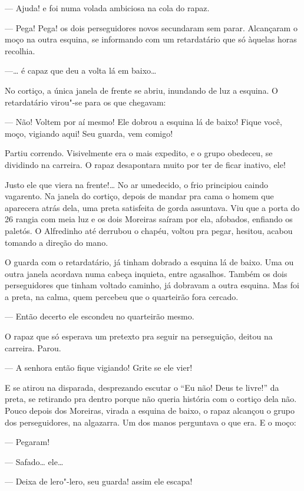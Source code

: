 --- Ajuda! e foi numa volada ambiciosa na cola do rapaz.

--- Pega! Pega! os dois perseguidores novos secundaram sem parar.
Alcançaram o moço na outra esquina, se informando com um retardatário
que só àquelas horas recolhia.

---\ldots{} é capaz que deu a volta lá em baixo\ldots{}

No cortiço, a única janela de frente se abriu, inundando de luz a
esquina. O retardatário virou"-se para os que chegavam:

--- Não! Voltem por aí mesmo! Ele dobrou a esquina lá de baixo! Fique
você, moço, vigiando aqui! Seu guarda, vem comigo!

Partiu correndo. Visivelmente era o mais expedito, e o grupo obedeceu,
se dividindo na carreira. O rapaz desapontara muito por ter de ficar
inativo, ele!

Justo ele que viera na frente!\ldots{} No ar umedecido, o frio principiou
caindo vagarento. Na janela do cortiço, depois de mandar pra cama o
homem que aparecera atrás dela, uma preta satisfeita de gorda assuntava.
Viu que a porta do 26 rangia com meia luz e os dois Moreiras saíram por
ela, afobados, enfiando os paletós. O Alfredinho até derrubou o chapéu,
voltou pra pegar, hesitou, acabou tomando a direção do mano.

O guarda com o retardatário, já tinham dobrado a esquina lá de baixo.
Uma ou outra janela acordava numa cabeça inquieta, entre agasalhos.
Também os dois perseguidores que tinham voltado caminho, já dobravam a
outra esquina. Mas foi a preta, na calma, quem percebeu que o quarteirão
fora cercado.

--- Então decerto ele escondeu no quarteirão mesmo.

O rapaz que só esperava um pretexto pra seguir na perseguição, deitou na
carreira. Parou.

--- A senhora então fique vigiando! Grite se ele vier!

E se atirou na disparada, desprezando escutar o ``Eu não! Deus te
livre!'' da preta, se retirando pra dentro porque não queria história
com o cortiço dela não. Pouco depois dos Moreiras, virada a esquina de
baixo, o rapaz alcançou o grupo dos perseguidores, na algazarra. Um dos
manos perguntava o que era. E o moço:

--- Pegaram!

--- Safado\ldots{} ele\ldots{}

--- Deixa de lero"-lero, seu guarda! assim ele escapa!

